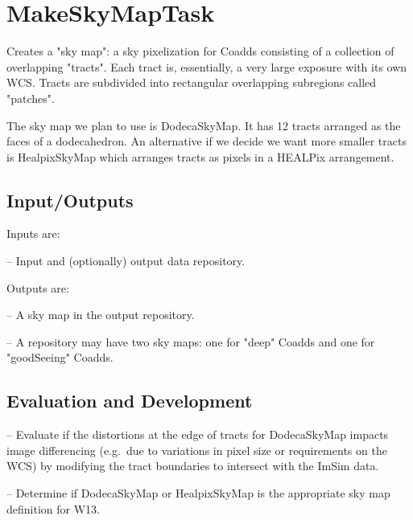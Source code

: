 \documentclass[prd, nofootinbib, floatfix, 11pt,tightenlines,times]{article}
\begin{document}



\section{MakeSkyMapTask} 

Creates a "sky map": a sky pixelization for Coadds consisting of a
collection of overlapping "tracts".  Each tract is, essentially, a
very large exposure with its own WCS.  Tracts are subdivided into
rectangular overlapping subregions called "patches".

The sky map we plan to use is DodecaSkyMap. It has 12 tracts arranged
as the faces of a dodecahedron.  An alternative if we decide we want
more smaller tracts is HealpixSkyMap which arranges tracts as pixels
in a HEALPix arrangement.

\subsection{Input/Outputs}
 Inputs are:

--  Input and (optionally) output data repository.

Outputs are:

-- A sky map in the output repository.

-- A repository may have two sky maps: one for "deep" Coadds and one for "goodSeeing" Coadds.

\subsection{Evaluation and Development}

-- Evaluate if the distortions at the edge of tracts for DodecaSkyMap
impacts image differencing (e.g.\ due to variations in pixel size or
requirements on the WCS) by modifying the tract boundaries to
intersect with the ImSim data. 

-- Determine if DodecaSkyMap or HealpixSkyMap is the appropriate sky
map definition for W13.
\end{document}
